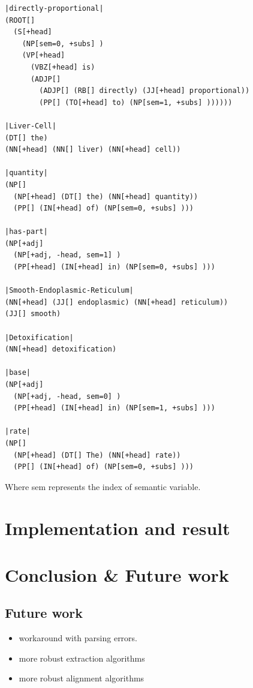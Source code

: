 \documentclass[a4paper]{article}
\begin{document}
\begin{verbatim}
|directly-proportional|
(ROOT[]
  (S[+head]
    (NP[sem=0, +subs] )
    (VP[+head]
      (VBZ[+head] is)
      (ADJP[]
        (ADJP[] (RB[] directly) (JJ[+head] proportional))
        (PP[] (TO[+head] to) (NP[sem=1, +subs] ))))))

|Liver-Cell|
(DT[] the)
(NN[+head] (NN[] liver) (NN[+head] cell))

|quantity|
(NP[]
  (NP[+head] (DT[] the) (NN[+head] quantity))
  (PP[] (IN[+head] of) (NP[sem=0, +subs] )))

|has-part|
(NP[+adj]
  (NP[+adj, -head, sem=1] )
  (PP[+head] (IN[+head] in) (NP[sem=0, +subs] )))

|Smooth-Endoplasmic-Reticulum|
(NN[+head] (JJ[] endoplasmic) (NN[+head] reticulum))
(JJ[] smooth)

|Detoxification|
(NN[+head] detoxification)

|base|
(NP[+adj]
  (NP[+adj, -head, sem=0] )
  (PP[+head] (IN[+head] in) (NP[sem=1, +subs] )))

|rate|
(NP[]
  (NP[+head] (DT[] The) (NN[+head] rate))
  (PP[] (IN[+head] of) (NP[sem=0, +subs] )))
\end{verbatim}
Where sem represents the index of semantic variable.

\section{Implementation and result}

\section{Conclusion \& Future work}
\subsection{Future work}
\begin{itemize}
    \item workaround with parsing errors.
    \item more robust extraction algorithms
    \item more robust alignment algorithms
\end{itemize}
\end{document}
